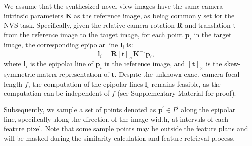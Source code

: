 We assume that the synthesized novel view images have the same camera intrinsic parameters $\mathbf{K}$ as the reference image, as being commonly set for the NVS task.
Specifically, given the relative camera rotation $\mathbf{R}$ and translation $\boldsymbol{t}$ from the reference image to the target image, for each point $\boldsymbol{p}_i$ in the target image, the corresponding epipolar line  $\mathbf{l}_i$ is:
\begin{equation}
\label{eq:epipolar}
    \boldsymbol{l}_i = \mathbf{R} [\boldsymbol{t}]_{\times} \mathbf{K}^{-1} \boldsymbol{p}_i,
\end{equation}
where $\mathbf{l}_i$ is the epipolar line of $\boldsymbol{p}_i$ in the reference image, and $[\boldsymbol{t}]_{\times}$ is the skew-symmetric matrix representation of $\boldsymbol{t}$.
Despite the unknown exact camera focal length $f$, the computation of the epipolar lines $\mathbf{l}_i$ remains feasible, as the computation can be independent of $f$ (see Supplementary Material for proof).

Subsequently, we sample a set of points denoted as $\boldsymbol{p}^{\prime} \in P^{\prime}$ along the epipolar line, specifically along the direction of the image width, at intervals of each feature pixel. Note that some sample points may be outside the feature plane and will be masked during the similarity calculation and feature retrieval process.

